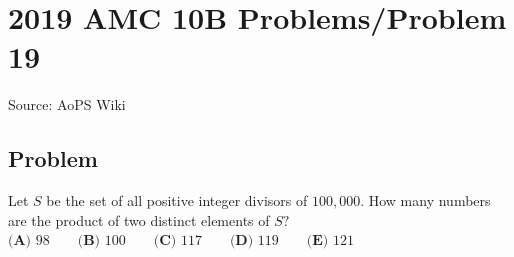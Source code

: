 \documentclass[12pt]{article}
\begin{document}
\section*{{2019 AMC 10B Problems/Problem 19}}
Source: AoPS Wiki

\subsection*{Problem}
Let $S$ be the set of all positive integer divisors of $100,000.$ How many numbers are the product of two distinct elements of $S?$ $\textbf{(A) }98\qquad\textbf{(B) }100\qquad\textbf{(C) }117\qquad\textbf{(D) }119\qquad\textbf{(E) }121$
\end{document}
